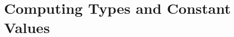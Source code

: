 \makeatletter{}\documentclass[10pt,oneside]{book}
\theoremstyle{note}
\newtheorem{definition}{Definition}[section]
\newcommand{\nsval}{{\sf nsval}}
\newcommand{\id}{{\sf id}}
\newcommand{\lexenv}{{\sf LexEnv}}
\begin{document}
\section{Computing Types and Constant Values}\label{sec:expressions-types}







\end{document}
